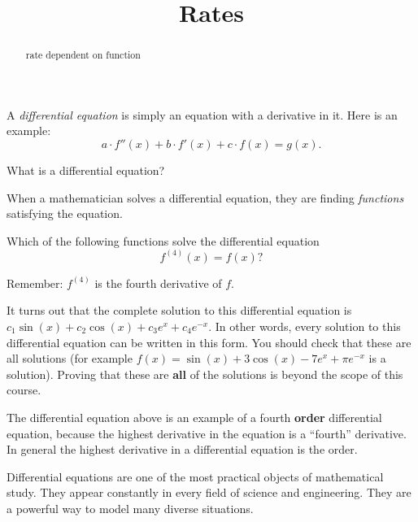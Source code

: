 \documentclass{ximera}
\title{Rates}
\begin{document}
\begin{abstract}
  rate dependent on function
\end{abstract}
\maketitle

A \textit{differential equation} is
simply an equation with a derivative in it. Here is an example:
\[
a \cdot f''(x) + b \cdot f'(x) + c \cdot f(x) = g(x). 
\]
\begin{question}
  What is a differential equation?
  \begin{multipleChoice}
  \end{multipleChoice}
\end{question}








When a mathematician solves a differential equation, they are finding
\textit{functions} satisfying the equation.
\begin{example}
  Which of the following functions solve the differential equation
  \[
  f^{(4)}(x) = f(x)?
  \]

    Remember: $f^{(4)}$ is the fourth derivative of $f$.

    It turns out that the complete solution to this differential equation
    is $c_1\sin(x)+c_2\cos(x)+c_3e^x+c_4e^{-x}$.  In other words, every
    solution to this differential equation can be written in this form.
    You should check that these are all solutions (for example $f(x) =
    \sin(x)+3\cos(x)-7e^x+\pi e^{-x}$ is a solution).  Proving that these
    are \textbf{all} of the solutions is beyond the scope of this course.

\end{example}


The differential equation above is an example of a fourth \textbf{order}
differential equation, because the highest derivative in the equation
is a ``fourth'' derivative. In general the highest derivative in a
differential equation is the order.


Differential equations are one of the most practical objects of
mathematical study.  They appear constantly in every field of science
and engineering.  They are a powerful way to model many diverse
situations.
\end{document}
